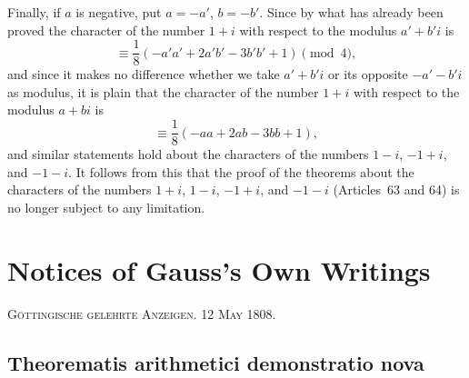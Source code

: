 \documentclass[12pt]{article}
\begin{document}
Finally, if $a$ is negative, put $a=-a'$, $b=-b'$. Since by what has already been proved the character of the number $1+i$ with respect to the modulus $a'+b'i$ is
\[
\equiv \frac18(-a'a'+2a'b'-3b'b'+1)\pmod4,
\]
and since it makes no difference whether we take $a'+b'i$ or its opposite $-a'-b'i$ as modulus, it is plain that the character of the number $1+i$ with respect to the modulus $a+bi$ is
\[
\equiv \frac18(-aa+2ab-3bb+1),
\]
and similar statements hold about the characters of the numbers $1-i$, $-1+i$, and $-1-i$. It follows from this that the proof of the theorems about the characters of the numbers $1+i$, $1-i$, $-1+i$, and $-1-i$ (Articles~63 and 64) is no longer subject to any limitation.


\clearpage

\section*{Notices of Gauss's Own Writings}

\begin{center}
\textsc{Göttingische gelehrte Anzeigen. 12 May 1808.}
\end{center}

\subsection*{Theorematis arithmetici demonstratio nova}
\end{document}
